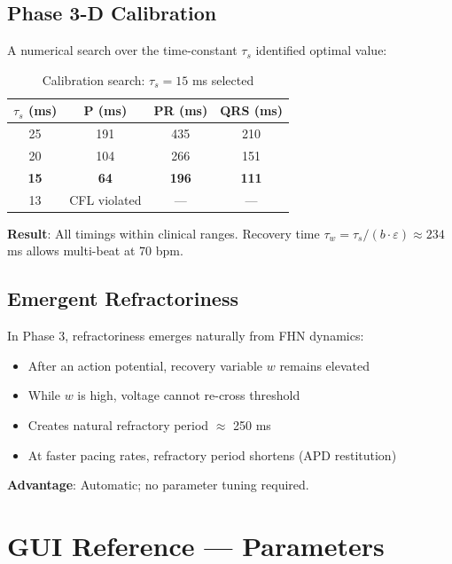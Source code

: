 \documentclass[12pt,oneside,a4paper]{book}
\begin{document}
\section{Phase 3-D Calibration}

A numerical search over the time-constant $\tau_s$ identified optimal value:

\begin{table}[htb]
\centering
\begin{tabularx}{\textwidth}{|c|c|c|c|}
\hline
$\tau_s$ (ms) & P (ms) & PR (ms) & QRS (ms) \\
\hline
25 & 191 & 435 & 210 \\
20 & 104 & 266 & 151 \\
\textbf{15} & \textbf{64} & \textbf{196} & \textbf{111} \\
13 & CFL violated & — & — \\
\hline
\end{tabularx}
\caption{Calibration search: $\tau_s = 15$ ms selected}
\label{tab:calibration}
\end{table}

\textbf{Result}: All timings within clinical ranges. Recovery time $\tau_w = \tau_s/(b \cdot \varepsilon) \approx 234$ ms allows multi-beat at 70 bpm.

\section{Emergent Refractoriness}

In Phase 3, refractoriness emerges naturally from FHN dynamics:

\begin{itemize}
  \item After an action potential, recovery variable $w$ remains elevated
  \item While $w$ is high, voltage cannot re-cross threshold
  \item Creates natural refractory period $\approx$ 250 ms
  \item At faster pacing rates, refractory period shortens (APD restitution)
\end{itemize}

\textbf{Advantage}: Automatic; no parameter tuning required.


\chapter{GUI Reference --- Parameters}
\end{document}
